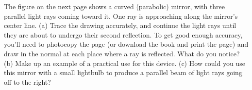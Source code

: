 The  figure on the next page shows a curved (parabolic) mirror, with
three parallel light rays coming toward it. One ray is
approaching along the mirror's center line. (a) Trace the
drawing accurately, and continue the light rays until they
are about to undergo their second reflection.  To get good enough accuracy, you'll need to
photocopy the page (or download the book and print the page)
and draw in the normal at each place where a ray is reflected.
What do you notice?
(b) Make up an example of a practical use for this device.
(c) How could you use this mirror with a small lightbulb to
produce a parallel beam of light rays going off to the right?
